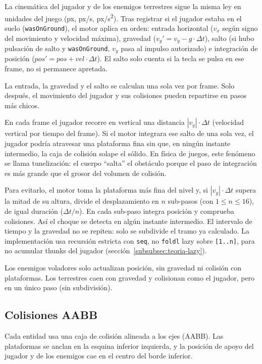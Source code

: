 La cinemática del jugador y de los enemigos terrestres sigue la misma
ley en unidades del juego (px, px/s, px/s\textsuperscript{2}). Tras registrar si
el jugador estaba en el suelo (\texttt{wasOnGround}), el motor aplica en
orden: entrada horizontal ($v_x$ según signo del movimiento y velocidad máxima),
gravedad ($v_y' = v_y - g \cdot \Delta t$), salto (si hubo pulsación de salto y
\texttt{wasOnGround}, $v_y$ pasa al impulso autorizado) e integración de posición
($\mathit{pos}' = \mathit{pos} + \mathit{vel} \cdot \Delta t$). El salto solo
cuenta si la tecla se pulsa en ese frame, no si permanece apretada.

La entrada, la gravedad y el salto se calculan una sola vez por frame.
Solo después, el movimiento del jugador y sus colisiones pueden repartirse en
pasos más chicos.

En cada frame el jugador recorre en vertical una distancia $|v_y| \cdot \Delta t$
(velocidad vertical por tiempo del frame). Si el motor integrara ese salto de
una sola vez, el jugador podría atravesar una plataforma fina sin que, en ningún
instante intermedio, la caja de colisión solape el sólido. En física de juegos, este
fenómeno se llama tunelización: el cuerpo ``salta'' el obstáculo porque el paso de
integración es más grande que el grosor del volumen de colisión.

Para evitarlo, el motor toma la plataforma más fina del nivel y, si
$|v_y| \cdot \Delta t$ supera la mitad de su altura, divide el desplazamiento en $n$
sub-pasos (con $1 \le n \le 16$), de igual duración ($\Delta t / n$). En cada sub-paso
integra posición y comprueba colisiones. Así el choque se detecta en algún instante
intermedio. El intervalo de tiempo y la gravedad no se repiten: solo se subdivide el
tramo ya calculado. La implementación usa recursión estricta con \texttt{seq}, no
\texttt{foldl} lazy sobre \texttt{[1..n]}, para no acumular thunks del jugador
(sección~\ref{subsubsec:teoria-lazy}).

Los enemigos voladores solo actualizan posición, sin gravedad ni colisión con
plataformas. Los terrestres caen con gravedad y colisionan como el jugador, pero en
un único paso (sin subdivisión).

\subsection{Colisiones AABB}
\label{subsec:colisiones}

Cada entidad usa una caja de colisión alineada a los ejes (AABB). Las
plataformas se anclan en la esquina inferior izquierda, y la posición de apoyo del jugador y de
los enemigos cae en el centro del borde inferior.

